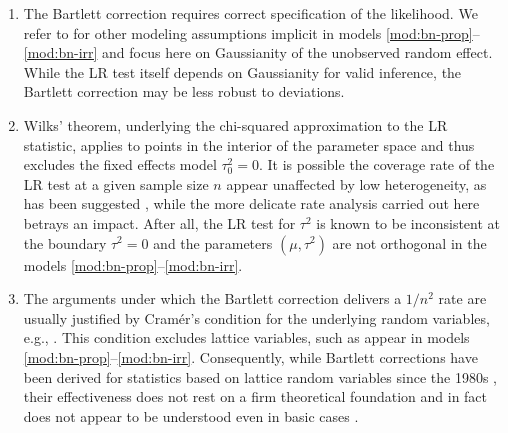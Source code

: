 \documentclass[12pt]{article}
\newcommand{\n}{n}
\newcommand{\effect}{\mu}
\newcommand{\tausqnull}{\tau^2_{0}}
\newcommand{\comment}[2][red]{%
 \iftoggle{commenttoggle}{%
  {\normalsize{\color{#1}{#2}}\normalsize}%
 }{%
 }%
}
\begin{document}
\begin{enumerate}
\item The Bartlett correction requires correct specification of the
  likelihood. We refer to \citet{stijnen:10} for other modeling
  assumptions implicit in models \eqref{mod:bn-prop}--\eqref{mod:bn-irr} %
  and focus here
  on Gaussianity of the unobserved random effect.  While the LR test
  itself depends on Gaussianity for valid inference, the Bartlett correction may be
  less robust to deviations.

\item Wilks' theorem, underlying the chi-squared approximation to the
  LR statistic, applies to points in the interior of the
  parameter space and thus excludes the fixed effects model
  $\tausqnull=0$. %
  It is
  possible the coverage rate of the LR test at a given sample size $\n$
appear unaffected by low heterogeneity, as has been suggested \citep{jackson:18,bakbergenuly:18}, while the more
  delicate rate analysis carried out here betrays an
  impact. After all, the LR test for $\tau^2$ is  known to be inconsistent at the boundary $\tau^2=0$ \citep{self:87} and the parameters $(\mu,\tau^2)$ are not orthogonal %
  in the models \eqref{mod:bn-prop}--\eqref{mod:bn-irr}.%

\item The arguments under which the Bartlett correction
delivers a $1/\n^2$ rate are usually justified by Cram\'er's condition
for the underlying random variables, e.g., \citep{jensen:93}. This condition excludes lattice
variables, such as appear in models \eqref{mod:bn-prop}--\eqref{mod:bn-irr}. Consequently, while Bartlett corrections have been derived for statistics based on lattice random variables since  the 1980s \citep{cordeiro:83}, their
effectiveness does not rest on a firm theoretical foundation and in fact does not appear to be understood even in basic cases \citep{frydenberg:89,jensen:93,gotze:06}.
\end{enumerate}
\end{document}

